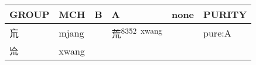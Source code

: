 \documentclass[14pt,a4paper]{scrartcl}
\begin{document}
\begin{longtable}[c]{@{}llllll@{}}
\toprule
\begin{minipage}[b]{0.14\columnwidth}\raggedright\strut
GROUP
\strut\end{minipage} &
\begin{minipage}[b]{0.14\columnwidth}\raggedright\strut
MCH
\strut\end{minipage} &
\begin{minipage}[b]{0.14\columnwidth}\raggedright\strut
B
\strut\end{minipage} &
\begin{minipage}[b]{0.14\columnwidth}\raggedright\strut
A
\strut\end{minipage} &
\begin{minipage}[b]{0.14\columnwidth}\raggedright\strut
none
\strut\end{minipage} &
\begin{minipage}[b]{0.14\columnwidth}\raggedright\strut
PURITY
\strut\end{minipage}\tabularnewline
\midrule
\endhead
\begin{minipage}[t]{0.14\columnwidth}\raggedright\strut
巟
\strut\end{minipage} &
\begin{minipage}[t]{0.14\columnwidth}\raggedright\strut
mjang
\strut\end{minipage} &
\begin{minipage}[t]{0.14\columnwidth}\raggedright\strut
\strut\end{minipage} &
\begin{minipage}[t]{0.14\columnwidth}\raggedright\strut
荒\textsuperscript{8352~xwang}
\strut\end{minipage} &
\begin{minipage}[t]{0.14\columnwidth}\raggedright\strut
\strut\end{minipage} &
\begin{minipage}[t]{0.14\columnwidth}\raggedright\strut
pure:A
\strut\end{minipage}\tabularnewline
\begin{minipage}[t]{0.14\columnwidth}\raggedright\strut
㠩
\strut\end{minipage} &
\begin{minipage}[t]{0.14\columnwidth}\raggedright\strut
xwang
\strut\end{minipage} &
\begin{minipage}[t]{0.14\columnwidth}\raggedright\strut
\strut\end{minipage} &
\begin{minipage}[t]{0.14\columnwidth}\raggedright\strut

\end{minipage}
\end{longtable}
\end{document}
